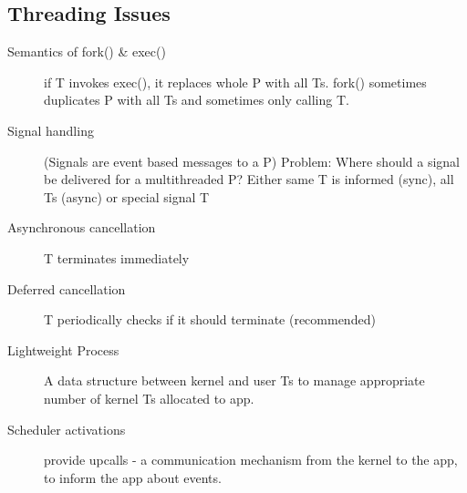 \subsection*{Threading Issues}
\begin{description}
\item[Semantics of fork() \& exec()] if T invokes exec(), it replaces whole P with all Ts. fork() sometimes duplicates P with all Ts and sometimes only calling T.
  \item[Signal handling] (Signals are event based messages to a P) Problem: Where should a signal be delivered for a multithreaded P? Either same T is informed (sync), all Ts (async) or special signal T
  \item[Asynchronous cancellation] T terminates immediately
  \item[Deferred cancellation] T periodically checks if it should terminate (recommended)
  \item[Lightweight Process] A data structure between kernel and user Ts to manage appropriate number of kernel Ts allocated to app.
  \item[Scheduler activations] provide upcalls - a communication mechanism from the kernel to the app, to inform the app about events.
\end{description}
